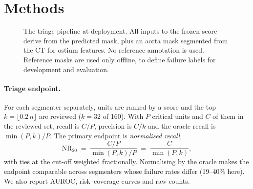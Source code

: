 \documentclass[11pt]{article}
\newcommand{\NR}{\mathrm{NR}_{20}}
\begin{document}
\section{Methods}
\begin{figure}[t]
\centering
{}
\caption{The triage pipeline at deployment. All inputs to the frozen score derive from the predicted mask, plus an aorta mask segmented from the CT for ostium features. No reference annotation is used. Reference masks are used only offline, to define failure labels for development and evaluation.}
\label{fig:pipeline}
\end{figure}

\paragraph{Triage endpoint.} For each segmenter separately, units are ranked by a score and the top $k = \lfloor 0.2\,n \rfloor$ are reviewed ($k = 32$ of 160). With $P$ critical units and $C$ of them in the reviewed set, recall is $C/P$, precision is $C/k$ and the oracle recall is $\min(P,k)/P$. The primary endpoint is \emph{normalised recall},
\[
\NR \;=\; \frac{C/P}{\min(P,k)/P} \;=\; \frac{C}{\min(P,k)},
\]
with ties at the cut-off weighted fractionally. Normalising by the oracle makes the endpoint comparable across segmenters whose failure rates differ (19--40\% here). We also report AUROC, risk--coverage curves \citep{geifman2017selective} and raw counts.
\end{document}
